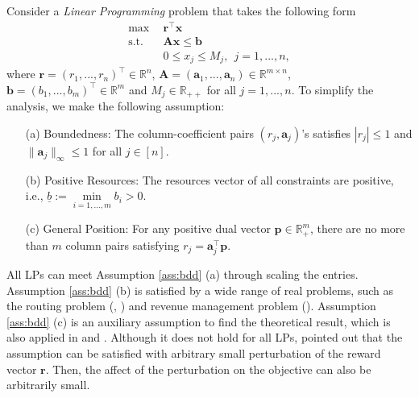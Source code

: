\documentclass{article} %
\newcommand{\R}{\mathbb{R}}
\begin{document}
Consider a \textit{Linear Programming} problem that takes the following form
\begin{align}
   \tag{LP} \max \ \ & \bm{r}^\top \bm{x}   \\
    \text{s.t. }\ & \bm{A} \bm{x} \le \bm{b} \nonumber  \\ 
    & 0 \le x_j \le M_j, \ \ j=1,...,n \nonumber,
\end{align}
where $\bm{r} = (r_1,...,r_n)^{\top} \in \R^n$, $\bm{A} = (\bm{a}_1,...,\bm{a}_n) \in \R^{m\times n}$, $\bm{b} = (b_1,...,b_m)^{\top} \in \R^m$ and $M_j\in\mathbb{R}_{++}$ for all $j=1,...,n$. To simplify the analysis, we make the following assumption:
\begin{assumption}
\label{ass:bdd}
\begin{itemize}
    \item[(a)] Boundedness: The column-coefficient pairs $(r_j,\bm{a}_j)$'s satisfies $|r_j|\leq1$ and $\|\bm{a}_j\|_{\infty}\leq 1$ for all $j\in[n]$.
    \item[(b)] Positive Resources: The resources vector of all constraints are positive, i.e., $\underline{b}:=\min\limits_{i=1,...,m} b_i>0$.
    \item[(c)] General Position: For any positive dual vector $\bm{p}\in\mathbb{R}^{m}_{+}$, there are no more than $m$ column pairs satisfying $r_j=\bm{a}_j^{\top}\bm{p}$.
\end{itemize}
\end{assumption}
All LPs can meet Assumption \ref{ass:bdd} (a) through scaling the entries.
Assumption \ref{ass:bdd} (b) is satisfied by a wide range of real problems, such as the routing problem (\cite{buchbinder2006improved}, \cite{pelletier2019electric}) and revenue management problem (\cite{huang2015linear}). Assumption \ref{ass:bdd} (c) is an auxiliary assumption to find the theoretical result, which is also applied in \cite{agrawal2014dynamic} and \cite{li2020simple}. Although it does not hold for all LPs, \cite{devanur2009adwords} pointed out that the assumption can be satisfied with arbitrary small perturbation of the reward vector $\bm{r}$. Then, the affect of the perturbation on the objective can also be arbitrarily small.
\end{document}
